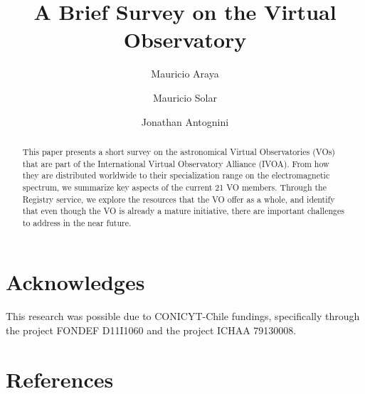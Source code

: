 \documentclass[preprint]{elsarticle}
\begin{document}
\title{A Brief Survey on the Virtual Observatory}

\author[utfsm]{Mauricio Araya}


\author[utfsm]{Mauricio Solar}


\author[alma]{Jonathan Antognini}



\address[utfsm]{Universidad T\'ecnica Federico Santa Mar\'ia\\
Avenida Espa\~na 1680, Valpara\'iso, Chile}


\address[alma]{ALMA Observatory\\
Alonso de Córdova 3107, Vitacura, Santiago,
Chile}

\begin{abstract}
This paper presents a short survey on the astronomical Virtual Observatories (VOs) that are 
part of the International Virtual Observatory Alliance (IVOA). From how they are
distributed worldwide to their specialization range on the electromagnetic spectrum, 
we summarize key aspects of the current 21 VO members. Through the Registry
service, we explore the resources that the VO offer as a whole, and identify 
that even though the VO is already a mature initiative, there are important
challenges to address in the near future.
\end{abstract}

\maketitle



















\section*{Acknowledges}
This research was possible due to CONICYT-Chile fundings, specifically 
through the project FONDEF D11I1060 and the project ICHAA 79130008.
\section{References}





%



\end{document}
